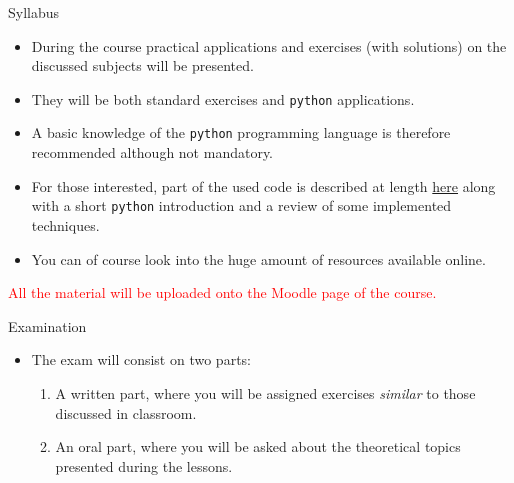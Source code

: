 \documentclass{beamer}
\begin{document}
\begin{frame}{Syllabus}
	\begin{itemize}	
		\item During the course practical applications and exercises (with solutions) on the discussed subjects will be presented.
		\item They will be both standard exercises and \texttt{python} applications.
		\item A basic knowledge of the \texttt{python} programming language is therefore recommended although not mandatory.
		\item For those interested, part of the used code is described at length \href{https://drive.google.com/file/d/1GnlyuB4KkUbzqL7tf6nju-ZEqnfQrRa4/view?usp=drive_link}{here} along with a short \texttt{python} introduction and a review of some implemented techniques.
		\item You can of course look into the huge amount of resources available online.
	\end{itemize}
	\begin{center}
	\textcolor{red}{All the material will be uploaded onto the Moodle page of the course.}
	\end{center}
\end{frame}

\begin{frame}{Examination}
	\begin{itemize}	
		\item The exam will consist on two parts: 
		\begin{enumerate}
			\item A written part, where you will be assigned exercises \emph{similar} to those discussed in classroom.
			\item An oral part, where you will be asked about the theoretical topics presented during the lessons.
		\end{enumerate} 
	\end{itemize}
\end{frame}
\end{document}

